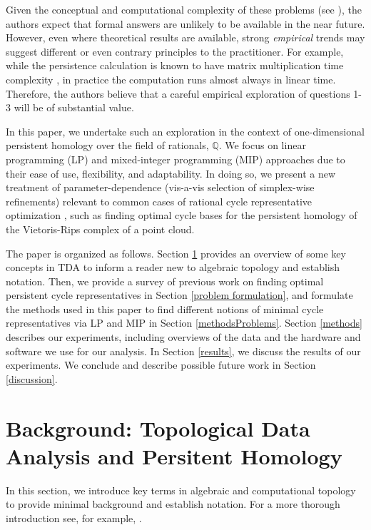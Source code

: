 \documentclass[utf8]{formatting_stuff/frontiersFPHY}
\newcommand{\Q}{\mathbb{Q}}
\newcommand{\se}{Section }
\theoremstyle{plain}
\theoremstyle{definition}
\begin{document}
Given the conceptual and computational complexity of these problems (see \cite{chenhardness}), the authors expect that formal answers are unlikely to be available in the near future. However, even where theoretical results are available, strong \emph{empirical} trends may suggest different or even contrary principles to the practitioner. For example, while the persistence calculation is known to have matrix multiplication time complexity  \cite{primoz}, in practice the computation runs almost always in linear time. Therefore, the authors believe that a careful empirical exploration of questions 1-3 will be of substantial value. 

In this paper, we undertake such an exploration in the context of one-dimensional persistent homology over the field of rationals, $\Q$. We focus on linear programming (LP) and mixed-integer programming (MIP) approaches due to their ease of use, flexibility, and adaptability. In doing so, we present a new treatment of parameter-dependence (vis-a-vis selection of simplex-wise refinements) relevant to common cases of rational cycle representative optimization \cite{Obayashi2018, Escolar2016}, such as finding optimal cycle bases for the persistent homology of the Vietoris-Rips complex of a point cloud.

The paper is organized as follows. \se \ref{background} provides an overview of some key concepts in TDA to inform a reader new to algebraic topology and establish notation. Then, we provide a survey of previous work on finding optimal persistent cycle representatives in \se \ref{problem formulation}, and formulate the methods used in this paper to find different notions of minimal cycle representatives via LP and MIP in 
\se \ref{methodsProblems}. \se \ref{methods} describes our experiments, including overviews of the data and the hardware and software we use for our analysis. In \se \ref{results},  we discuss the results of our experiments. We conclude and describe possible future work in \se \ref{discussion}.
    
 \section{Background: Topological Data Analysis and Persitent Homology}\label{background}
\label{sec:background}


In this section, we introduce key terms in algebraic and computational topology to provide minimal background and establish notation. For a more thorough introduction see, for example, \cite{Carlsson2009TopologyAD, hatcher2002algebraic, edelsbrunner2010computational, barcodeGhrist, persistenthomologyasurvey,TZH15}. 
 
\end{document}
